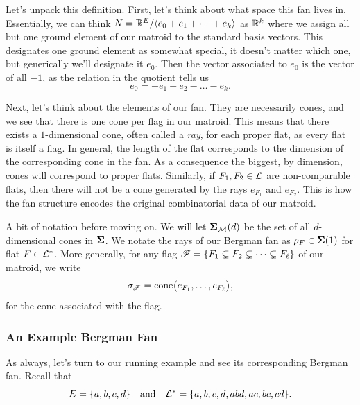\documentclass[12pt,oneside]{../../sfsuthesis}
\begin{document}
Let's unpack this definition.
First, let's think about what space this fan lives in.
Essentially, we can think \( N = \mathbb{R}^{E}/\langle e_0 + e_1 + \cdots + e_k \rangle \) as \( \mathbb{R}^k \) where we assign all but one ground element of our matroid to the standard basis vectors.
This designates one ground element as somewhat special, it doesn't matter which one, but generically we'll designate it \( e_0 \).
Then the vector associated to \( e_0 \) is the vector of all \( -1 \), as the relation in the quotient tells us
\[
    e_0 = -e_1 - e_2 - \dots - e_k.
\]

Next, let's think about the elements of our fan.
They are necessarily cones, and we see that there is one cone per flag in our matroid.
This means that there exists a \( 1 \)-dimensional cone, often called a \textit{ray}, for each proper flat, as every flat is itself a flag.
In general, the length of the flat corresponds to the dimension of the corresponding cone in the fan.
As a consequence the biggest, by dimension, cones will correspond to proper flats.
Similarly, if \( F_1, F_2 \in \mathcal{L} \) are non-comparable flats, then there will not be a cone generated by the rays \( e_{F_1} \) and \( e_{F_2} \).
This is how the fan structure encodes the original combinatorial data of our matroid.

A bit of notation before moving on.
We will let \( \bm{\Sigma}_{\mathcal{M}}(d) \) be the set of all \( d \)-dimensional cones in \( \bm{\Sigma} \).
We notate the rays of our Bergman fan as \( \rho_F \in \bm{\Sigma}(1) \) for flat \( F \in \mathcal{L}^\ast \).
More generally, for any flag \( \mathscr{F} = \{ F_1 \subsetneq F_2 \subsetneq \cdots \subsetneq F_\ell \} \) of our matroid, we write
\[
    \sigma_{\mathscr{F}} = \mathrm{cone}\bigl( e_{F_1}, \dots, e_{F_\ell} \bigr),
\]
for the cone associated with the flag.

\subsubsection{An Example Bergman Fan}
As always, let's turn to our running example and see its corresponding Bergman fan.
Recall that
\[
    E = \{ a, b, c, d \} \quad \text{and} \quad \mathcal{L}^\ast = \{ a, b, c, d, abd, ac, bc, cd \}.
\]
\end{document}
